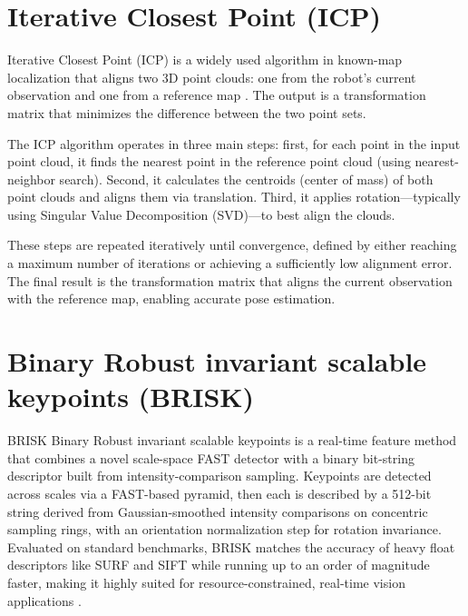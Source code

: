 \section{Iterative Closest Point (ICP)}
Iterative Closest Point (ICP) is a widely used algorithm in known-map localization that aligns two 3D point clouds: one from the robot's current observation and one from a reference map \cite{ref_icp}. The output is a transformation matrix that minimizes the difference between the two point sets.

\par
The ICP algorithm operates in three main steps: first, for each point in the input point cloud, it finds the nearest point in the reference point cloud (using nearest-neighbor search). Second, it calculates the centroids (center of mass) of both point clouds and aligns them via translation. Third, it applies rotation—typically using Singular Value Decomposition (SVD)—to best align the clouds.

\par
These steps are repeated iteratively until convergence, defined by either reaching a maximum number of iterations or achieving a sufficiently low alignment error. The final result is the transformation matrix that aligns the current observation with the reference map, enabling accurate pose estimation.

\section{Binary Robust invariant scalable keypoints (BRISK)}
BRISK Binary Robust invariant scalable keypoints is a real-time feature method that combines a novel scale-space FAST detector with a binary bit-string descriptor built from intensity-comparison sampling. Keypoints are detected across scales via a FAST-based pyramid, then each is described by a 512-bit string derived from Gaussian-smoothed intensity comparisons on concentric sampling rings, with an orientation normalization step for rotation invariance. Evaluated on standard benchmarks, BRISK matches the accuracy of heavy float descriptors like SURF and SIFT while running up to an order of magnitude faster, making it highly suited for resource-constrained, real-time vision applications \cite{ref_brisk}.